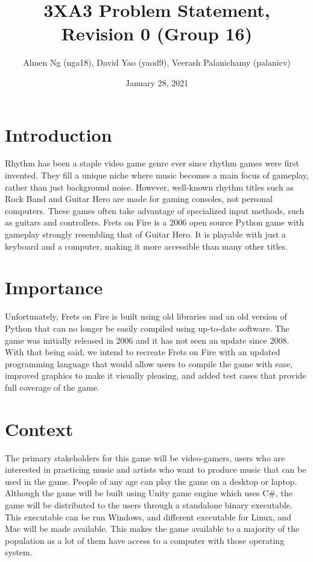 \documentclass[12pt,letterpaper]{article}
\title{3XA3 Problem Statement, Revision 0 (Group 16)}
\author{Almen Ng (nga18), David Yao (yaod9), Veerash Palanichamy (palanicv)}
\date{January 28, 2021}
\begin{document}
\maketitle

\section{Introduction}
Rhythm has been a staple video game genre ever since rhythm games were first invented. They fill a unique niche where music becomes a main focus of gameplay, rather than just background noise. However, well-known rhythm titles such as Rock Band and Guitar Hero are made for gaming consoles, not personal computers. These games often take advantage of specialized input methods, such as guitars and controllers. Frets on Fire is a 2006 open source Python game with gameplay strongly resembling that of Guitar Hero. It is playable with just a keyboard and a computer, making it more accessible than many other titles.

\section{Importance}
Unfortunately, Frets on Fire is built using old libraries and an old version of Python that can no longer be easily compiled using up-to-date software. The game was initially released in 2006 and it has not seen an update since 2008. With that being said, we intend to recreate Frets on Fire with an updated programming language that would allow users to compile the game with ease, improved graphics to make it visually pleasing, and added test cases that provide full coverage of the game. 

\section{Context}
The primary stakeholders for this game will be video-gamers, users who are interested in practicing music and artists who want to produce music that can be used in the game. People of any age can play the game on a desktop or laptop. 
\\Although the game will be built using Unity game engine which uses C\#, the game will be distributed to the users through a standalone binary executable. This executable can be run Windows, and  different executable for Linux, and Mac will be made available.   This makes the game available to a majority of the population as a lot of them have access to a computer with those operating system. \\
\end{document}
